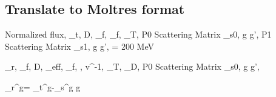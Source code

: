 \documentclass[11pt,letterpaper]{article}
\begin{document}
\subsection{Translate to Moltres format}

Normalized flux, \Sigma_t, D, \nu\Sigma_f, \Sigma_f, \chi_T, P0 Scattering Matrix \Sigma_{s0, g \rightarrow g'}, P1 Scattering Matrix \Sigma_{s1, g \rightarrow g'}, \Kappa = 200 MeV

\Sigma_r, \nu\Sigma_f, D, \beta_{eff}, \Sigma_f, \Kappa, v^{-1}, \chi_T, \chi_D, P0 Scattering Matrix \Sigma_{s0, g \rightarrow g'}, \lambda

\Sigma_r^g= \Sigma_t^g-\Sigma_s^{g \rightarrow g}

\pagebreak


\end{document}
